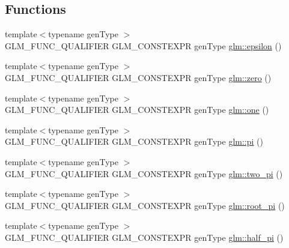 \subsection*{Functions}
\begin{DoxyCompactItemize}
\item 
{\footnotesize template$<$typename gen\+Type $>$ }\\G\+L\+M\+\_\+\+F\+U\+N\+C\+\_\+\+Q\+U\+A\+L\+I\+F\+I\+ER G\+L\+M\+\_\+\+C\+O\+N\+S\+T\+E\+X\+PR gen\+Type \hyperlink{group__gtc__constants_ga2a1e57fc5592b69cfae84174cbfc9429}{glm\+::epsilon} ()
\item 
{\footnotesize template$<$typename gen\+Type $>$ }\\G\+L\+M\+\_\+\+F\+U\+N\+C\+\_\+\+Q\+U\+A\+L\+I\+F\+I\+ER G\+L\+M\+\_\+\+C\+O\+N\+S\+T\+E\+X\+PR gen\+Type \hyperlink{group__gtc__constants_ga788f5a421fc0f40a1296ebc094cbaa8a}{glm\+::zero} ()
\item 
{\footnotesize template$<$typename gen\+Type $>$ }\\G\+L\+M\+\_\+\+F\+U\+N\+C\+\_\+\+Q\+U\+A\+L\+I\+F\+I\+ER G\+L\+M\+\_\+\+C\+O\+N\+S\+T\+E\+X\+PR gen\+Type \hyperlink{group__gtc__constants_ga39c2fb227631ca25894326529bdd1ee5}{glm\+::one} ()
\item 
{\footnotesize template$<$typename gen\+Type $>$ }\\G\+L\+M\+\_\+\+F\+U\+N\+C\+\_\+\+Q\+U\+A\+L\+I\+F\+I\+ER G\+L\+M\+\_\+\+C\+O\+N\+S\+T\+E\+X\+PR gen\+Type \hyperlink{group__gtc__constants_ga94bafeb2a0f23ab6450fed1f98ee4e45}{glm\+::pi} ()
\item 
{\footnotesize template$<$typename gen\+Type $>$ }\\G\+L\+M\+\_\+\+F\+U\+N\+C\+\_\+\+Q\+U\+A\+L\+I\+F\+I\+ER G\+L\+M\+\_\+\+C\+O\+N\+S\+T\+E\+X\+PR gen\+Type \hyperlink{group__gtc__constants_gaa5276a4617566abcfe49286f40e3a256}{glm\+::two\+\_\+pi} ()
\item 
{\footnotesize template$<$typename gen\+Type $>$ }\\G\+L\+M\+\_\+\+F\+U\+N\+C\+\_\+\+Q\+U\+A\+L\+I\+F\+I\+ER G\+L\+M\+\_\+\+C\+O\+N\+S\+T\+E\+X\+PR gen\+Type \hyperlink{group__gtc__constants_ga261380796b2cd496f68d2cf1d08b8eb9}{glm\+::root\+\_\+pi} ()
\item 
{\footnotesize template$<$typename gen\+Type $>$ }\\G\+L\+M\+\_\+\+F\+U\+N\+C\+\_\+\+Q\+U\+A\+L\+I\+F\+I\+ER G\+L\+M\+\_\+\+C\+O\+N\+S\+T\+E\+X\+PR gen\+Type \hyperlink{group__gtc__constants_ga0c36b41d462e45641faf7d7938948bac}{glm\+::half\+\_\+pi} ()
\item 

\end{DoxyCompactItemize}
